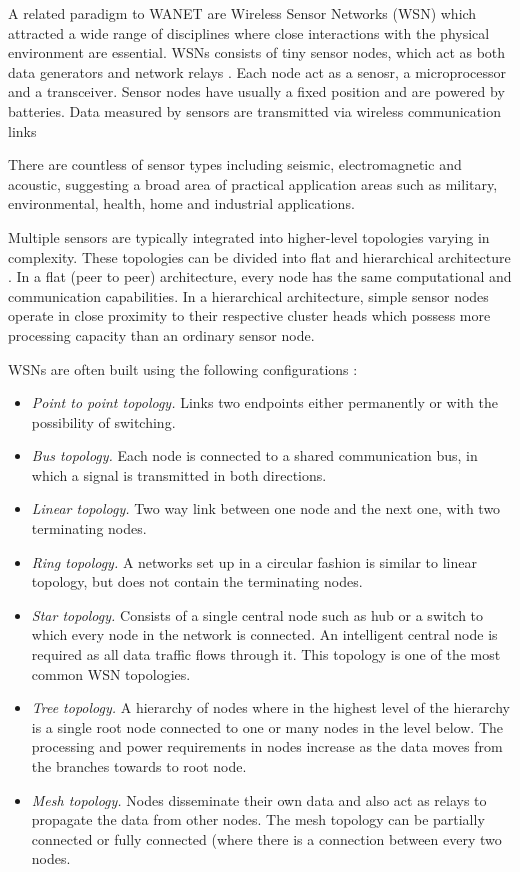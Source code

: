 A related paradigm to WANET are Wireless Sensor Networks (WSN) which attracted a wide range of disciplines where close interactions with the physical environment are essential.
WSNs consists of tiny sensor nodes, which act as both data generators and network relays \cite{akyildiz10}.
Each node act as a senosr, a microprocessor and a transceiver.
Sensor nodes have usually a fixed position and are powered by batteries.
Data measured  by sensors are transmitted via wireless communication links

There are countless of sensor types including seismic, electromagnetic and acoustic, suggesting a broad area of practical application areas such as 
military, environmental, health, home and industrial applications.

Multiple sensors are typically integrated into higher-level topologies varying in complexity.
These topologies can be divided into flat and hierarchical architecture \cite{mcgrath13}.
In a flat (peer to peer) architecture, every node has the same computational and communication capabilities.
In a hierarchical architecture, simple sensor nodes operate in close proximity to their respective cluster heads which possess more processing capacity than an ordinary sensor node.

WSNs are often built using the following configurations \cite{mcgrath13}:

\begin{itemize}
\item \emph{Point to point topology.} Links two endpoints either permanently or with the possibility of switching.
\item \emph{Bus topology.} Each node is connected to a shared communication bus, in which a signal is transmitted in both directions. 
\item \emph{Linear topology.} Two way link between one node and the next one, with two terminating nodes.
\item \emph{Ring topology.} A networks set up in a circular fashion is similar to linear topology, but does not contain the terminating nodes.
\item \emph{Star topology.} Consists of a single central node such as hub or a switch to which every node in the network is connected. 
An intelligent central node is required as all data traffic flows through it.
This topology is one of the most common WSN topologies.
\item \emph{Tree topology.} A hierarchy of nodes where in the highest level of the hierarchy is a single root node connected to one or many nodes in the level below.
The processing and power requirements in nodes increase as the data moves from the branches towards to root node.
\item \emph{Mesh topology.} Nodes disseminate their own data and also act as relays to propagate the data from other nodes.
The mesh topology can be partially connected  or fully connected (where there is a connection between every two nodes.
\end{itemize}

